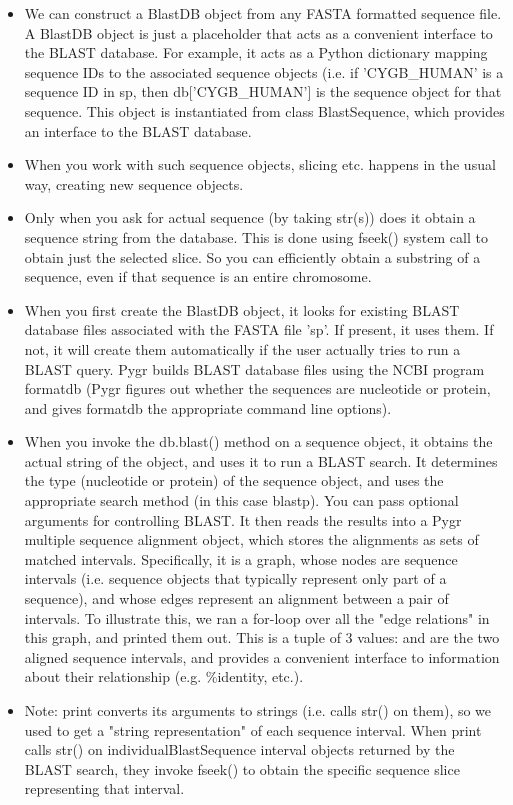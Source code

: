 \documentclass{howto}
\begin{document}
\begin{itemize}

\item
We can construct a BlastDB object from any FASTA formatted sequence file.  A BlastDB object is just a placeholder that acts as a convenient interface to the BLAST database.  For example, it acts as a Python dictionary mapping sequence IDs to the associated sequence objects (i.e. if 'CYGB_HUMAN' is a sequence ID in sp, then db['CYGB_HUMAN'] is the sequence object for that sequence.  This object is instantiated from class BlastSequence, which provides an interface to the BLAST database.

\item 
When you work with such sequence objects, slicing etc. happens in the usual way, creating new sequence objects.

\item  
Only when you ask for actual sequence (by taking str(s)) does it obtain a sequence string from the database.  This is done using fseek() system call to obtain just the selected slice.  So you can efficiently obtain a substring of a sequence, even if that sequence is an entire chromosome.

\item
When you first create the BlastDB object, it looks for existing BLAST database files associated with the FASTA file 'sp'.  If present, it uses them.  If not, it will create them automatically if the user actually tries to run a BLAST query.  Pygr builds BLAST database files using the NCBI program formatdb (Pygr figures out whether the sequences are nucleotide or protein, and gives formatdb the appropriate command line options).  

\item 
When you invoke the db.blast() method on a sequence object, it obtains the actual string of the object, and uses it to run a BLAST search.  It determines the type (nucleotide or protein) of the sequence object, and uses the appropriate search method (in this case blastp).  You can pass optional arguments for controlling BLAST.  It then reads the results into a Pygr multiple sequence alignment object, which stores the alignments as sets of matched intervals.  Specifically, it is a graph, whose nodes are sequence intervals (i.e. sequence objects that typically represent only part of a sequence), and whose edges represent an alignment between a pair of intervals.  To illustrate this, we ran a for-loop over all the "edge relations" in this graph, and printed them out.  This is a tuple of 3 values:  and  are the two aligned sequence intervals, and  provides a convenient interface to information about their relationship (e.g. \%identity, etc.).  

\item
Note: print converts its arguments to strings (i.e. calls str() on them), so we used  to get a "string representation" of each sequence interval.  When print calls str() on individualBlastSequence interval objects returned by the BLAST search, they invoke fseek() to obtain the specific sequence slice representing that interval.
\end{itemize}
\end{document}
